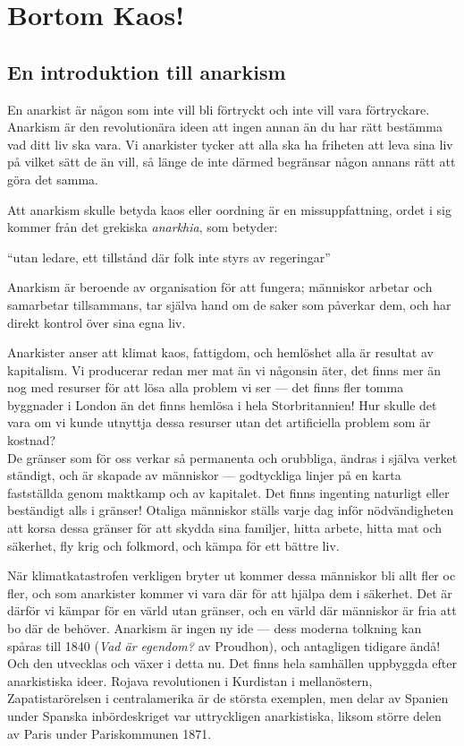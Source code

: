 \documentclass[
title=Bortom\ kaos!,
subtitle=En\ introduktion\ till\ anarkism,
subject=Anarkism,
creator=K.\ Räisänen,
author=Dawn\ Ray'd
]{pamphlet}
\begin{document}
    \section*{Bortom Kaos!}
    \subsection*{En introduktion till anarkism}
    \noindent
    En anarkist är någon som inte vill bli förtryckt och inte vill vara förtryckare. Anarkism är den revolutionära ideen att ingen annan än du har rätt bestämma vad ditt liv ska vara. Vi anarkister tycker att alla ska ha friheten att leva sina liv på vilket sätt de än vill, så länge de inte därmed begränsar någon annans rätt att göra det samma.

    Att anarkism skulle betyda kaos eller oordning är en missuppfattning, ordet i sig kommer från det grekiska \emph{anarkhia}, som betyder:
    
    \begin{boldquote}
    	``utan ledare, ett tillstånd där folk inte styrs av regeringar''
    \end{boldquote}
    
    \noindent
    Anarkism är beroende av organisation för att fungera; människor arbetar och samarbetar tillsammans, tar själva hand om de saker som påverkar dem, och har direkt kontrol över sina egna liv.
    
    Anarkister anser att klimat kaos, fattigdom, och hemlöshet alla är resultat av kapitalism. Vi producerar redan mer mat än vi någonsin äter, det finns mer än nog med resurser för att lösa alla problem vi ser --- det finns fler tomma byggnader i London än det finns hemlösa i hela Storbritannien! Hur skulle det vara om vi kunde utnyttja dessa resurser utan det artificiella problem som är kostnad?\\[2ex]
\noindent
    De gränser som för oss verkar så permanenta och orubbliga, ändras i själva verket ständigt, och är skapade av människor --- godtyckliga linjer på en karta fastställda genom maktkamp och av kapitalet. Det finns ingenting naturligt eller beständigt alls i gränser! Otaliga människor ställs varje dag inför nödvändigheten att korsa dessa gränser för att skydda sina familjer, hitta arbete, hitta mat och säkerhet, fly krig och folkmord, och kämpa för ett bättre liv.
    
    När klimatkatastrofen verkligen bryter ut kommer dessa människor bli allt fler oc fler, och som anarkister kommer vi vara där för att hjälpa dem i säkerhet. Det är därför vi kämpar för en värld utan gränser, och en värld där människor är fria att bo där de behöver. Anarkism är ingen ny ide --- dess moderna tolkning kan spåras till 1840 (\emph{Vad är egendom?} av Proudhon), och antagligen tidigare ändå! Och den utvecklas och växer i detta nu. Det finns hela samhällen uppbyggda efter anarkistiska ideer. Rojava revolutionen i Kurdistan i mellanöstern, Zapatistarörelsen i centralamerika är de största exemplen, men delar av Spanien under Spanska inbördeskriget var uttryckligen anarkistiska, liksom större delen av Paris under Pariskommunen 1871.
    
\end{document}

